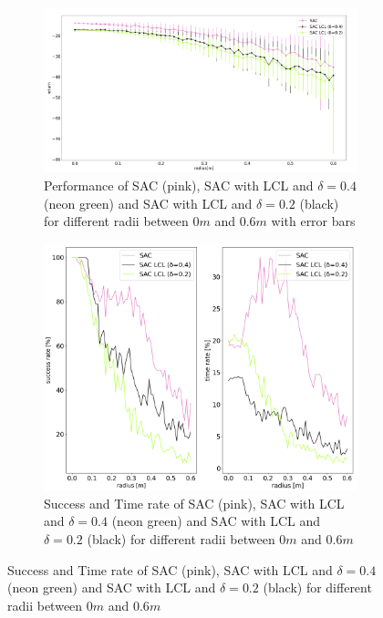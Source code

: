 \begin{figure}
	\centering
	\begin{subfigure}{0.63 \linewidth}
		\includegraphics[width=\linewidth]{figures/radiieval.png}
		\caption{Performance of SAC (pink), SAC with LCL and $\delta = 0.4$ (neon green)
				 and SAC with LCL and $\delta = 0.2$ (black) for different radii between $0m$ and $0.6m$ with error bars}	
		\label{fig:radiieval}
	\end{subfigure}
	\hfill
	\begin{subfigure}{0.3 \linewidth}
		\includegraphics[width=\linewidth]{figures/radiisuccess.png}
		\caption{Success and Time rate of SAC (pink), SAC with LCL and $\delta = 0.4$ (neon green)
		and SAC with LCL and $\delta = 0.2$ (black) for different radii between $0m$ and $0.6m$}
		\label{fig:radiisuccess}	
	\end{subfigure}
\end{figure}

